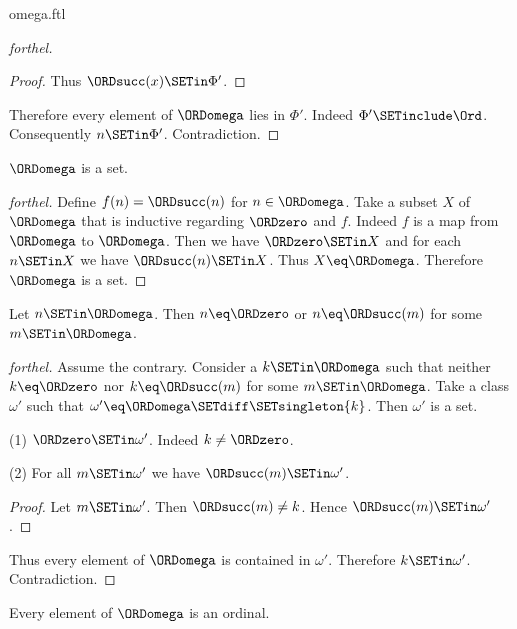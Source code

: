 \documentclass{naproche-library}
\begin{document}
\begin{smodule}[title=The Ordinal $\omega$]{omega.ftl}
\begin{proof}[forthel]
\begin{proof}
    Thus $\ORDsucc(x) \SETin \Phi'$.
  \end{proof}

  Therefore every element of $\ORDomega$ lies in $\Phi'$.
  Indeed $\Phi' \SETinclude \Ord$.
  Consequently $n \SETin \Phi'$.
  Contradiction.
\end{proof}

\begin{corollary}[forthel,id=SET_THEORY_03_4847727433220096]
  $\ORDomega$ is a set.
\end{corollary}
\begin{proof}[forthel]
  Define $f(n) = \ORDsucc(n)$ for $n \in \ORDomega$.
  Take a subset $X$ of $\ORDomega$ that is inductive regarding $\ORDzero$ and $f$.
  Indeed $f$ is a map from $\ORDomega$ to $\ORDomega$.
  Then we have $\ORDzero \SETin X$ and for each $n \SETin X$ we have $\ORDsucc(n) \SETin X$.
  Thus $X \eq \ORDomega$.
  Therefore $\ORDomega$ is a set.
\end{proof}

\begin{proposition}[forthel,id=SET_THEORY_03_5885789275684864]
  Let $n \SETin \ORDomega$.
  Then $n \eq \ORDzero$ or $n \eq \ORDsucc(m)$ for some $m \SETin \ORDomega$.
\end{proposition}
\begin{proof}[forthel]
  Assume the contrary.
  Consider a $k \SETin \ORDomega$ such that neither $k \eq \ORDzero$ nor $k \eq \ORDsucc(m)$ for
  some $m \SETin \ORDomega$.
  Take a class $\omega'$ such that $\omega' \eq \ORDomega \SETdiff \SETsingleton{k}$. %
  Then $\omega'$ is a set.

  (1) $\ORDzero \SETin \omega'$.
  Indeed $k \neq \ORDzero$.

  (2) For all $m \SETin \omega'$ we have $\ORDsucc(m) \SETin \omega'$.
  \begin{proof}
    Let $m \SETin \omega'$.
    Then $\ORDsucc(m) \neq k$.
    Hence $\ORDsucc(m) \SETin \omega'$.
  \end{proof}

  Thus every element of $\ORDomega$ is contained in $\omega'$.
  Therefore $k \SETin \omega'$.
  Contradiction.
\end{proof}

\begin{proposition}[forthel,id=SET_THEORY_03_5057540872208384]
  Every element of $\ORDomega$ is an ordinal.
\end{proposition}
\end{smodule}
\end{document}

